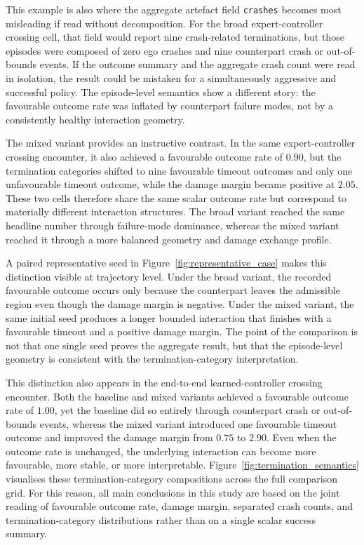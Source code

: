 \documentclass[drones,article,submit,pdftex,moreauthors]{Definitions/mdpi}
\begin{document}
This example is also where the aggregate artefact field \texttt{crashes} becomes most misleading if read without decomposition. For the broad expert-controller crossing cell, that field would report nine crash-related terminations, but those episodes were composed of zero ego crashes and nine counterpart crash or out-of-bounds events. If the outcome summary and the aggregate crash count were read in isolation, the result could be mistaken for a simultaneously aggressive and successful policy. The episode-level semantics show a different story: the favourable outcome rate was inflated by counterpart failure modes, not by a consistently healthy interaction geometry.

The mixed variant provides an instructive contrast. In the same expert-controller crossing encounter, it also achieved a favourable outcome rate of $0.90$, but the termination categories shifted to nine favourable timeout outcomes and only one unfavourable timeout outcome, while the damage margin became positive at $2.05$. These two cells therefore share the same scalar outcome rate but correspond to materially different interaction structures. The broad variant reached the same headline number through failure-mode dominance, whereas the mixed variant reached it through a more balanced geometry and damage exchange profile.

A paired representative seed in Figure~\ref{fig:representative_case} makes this distinction visible at trajectory level. Under the broad variant, the recorded favourable outcome occurs only because the counterpart leaves the admissible region even though the damage margin is negative. Under the mixed variant, the same initial seed produces a longer bounded interaction that finishes with a favourable timeout and a positive damage margin. The point of the comparison is not that one single seed proves the aggregate result, but that the episode-level geometry is consistent with the termination-category interpretation.

This distinction also appears in the end-to-end learned-controller crossing encounter. Both the baseline and mixed variants achieved a favourable outcome rate of $1.00$, yet the baseline did so entirely through counterpart crash or out-of-bounds events, whereas the mixed variant introduced one favourable timeout outcome and improved the damage margin from $0.75$ to $2.90$. Even when the outcome rate is unchanged, the underlying interaction can become more favourable, more stable, or more interpretable. Figure~\ref{fig:termination_semantics} visualises these termination-category compositions across the full comparison grid. For this reason, all main conclusions in this study are based on the joint reading of favourable outcome rate, damage margin, separated crash counts, and termination-category distributions rather than on a single scalar success summary.
\end{document}
